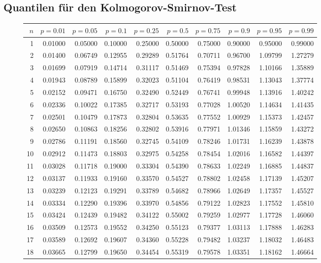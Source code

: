 \subsection{Quantilen für den Kolmogorov-Smirnov-Test}
\begin{figure}[h!]
\scriptsize
\begin{center}
\begin{tabular}{|r|rrr|rrr|rrr|}
\hline
$n$&$p=0.01$&$p=0.05$&$p=0.1$&$p=0.25$&$p=0.5$&$p=0.75$&$p=0.9$&$p=0.95$&$p=0.99$\\
\hline
1&0.01000&0.05000&0.10000&0.25000&0.50000&0.75000&0.90000&0.95000&0.99000\\
2&0.01400&0.06749&0.12955&0.29289&0.51764&0.70711&0.96700&1.09799&1.27279\\
3&0.01699&0.07919&0.14714&0.31117&0.51469&0.75394&0.97828&1.10166&1.35889\\
4&0.01943&0.08789&0.15899&0.32023&0.51104&0.76419&0.98531&1.13043&1.37774\\
5&0.02152&0.09471&0.16750&0.32490&0.52449&0.76741&0.99948&1.13916&1.40242\\
6&0.02336&0.10022&0.17385&0.32717&0.53193&0.77028&1.00520&1.14634&1.41435\\
7&0.02501&0.10479&0.17873&0.32804&0.53635&0.77552&1.00929&1.15373&1.42457\\
8&0.02650&0.10863&0.18256&0.32802&0.53916&0.77971&1.01346&1.15859&1.43272\\
9&0.02786&0.11191&0.18560&0.32745&0.54109&0.78246&1.01731&1.16239&1.43878\\
10&0.02912&0.11473&0.18803&0.32975&0.54258&0.78454&1.02016&1.16582&1.44397\\
11&0.03028&0.11718&0.19000&0.33304&0.54390&0.78633&1.02249&1.16885&1.44837\\
12&0.03137&0.11933&0.19160&0.33570&0.54527&0.78802&1.02458&1.17139&1.45207\\
13&0.03239&0.12123&0.19291&0.33789&0.54682&0.78966&1.02649&1.17357&1.45527\\
14&0.03334&0.12290&0.19396&0.33970&0.54856&0.79122&1.02823&1.17552&1.45810\\
15&0.03424&0.12439&0.19482&0.34122&0.55002&0.79259&1.02977&1.17728&1.46060\\
16&0.03509&0.12573&0.19552&0.34250&0.55123&0.79377&1.03113&1.17888&1.46283\\
17&0.03589&0.12692&0.19607&0.34360&0.55228&0.79482&1.03237&1.18032&1.46483\\
18&0.03665&0.12799&0.19650&0.34454&0.55319&0.79578&1.03351&1.18162&1.46664\\

\end{tabular}
\end{center}
\end{figure}
